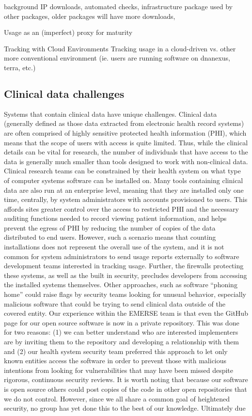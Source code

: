 \documentclass{article}
\begin{document}
background IP downloads, automated checks, infrastructure package used by other packages, older packages will have more downloads, 



Usage as an (imperfect) proxy for maturity

Tracking with Cloud Environments
Tracking usage in a cloud-driven vs. other more conventional environment (ie. users are running software on dnanexus, terra, etc.)



\subsection{Clinical data challenges}

Systems that contain clinical data have unique challenges.  Clinical data (generally defined as those data extracted from electronic health record systems) are often comprised of highly sensitive protected health information (PHI), which means that the scope of users with access is quite limited. Thus, while the clinical details can be vital for research, the number of individuals that have access to the data is generally much smaller than tools designed to work with non-clinical data. Clinical research teams can be constrained by their health system on what type of computer systems software can be installed on. Many tools containing clinical data are also run at an enterprise level, meaning that they are installed only one time, centrally, by system administrators with accounts provisioned to users. This affords sites greater control over the access to restricted PHI and the necessary auditing functions needed to record viewing patient information, and helps prevent the egress of PHI by reducing the number of copies of the data distributed to end users.  However, such a scenario means that counting installations does not represent the overall use of the system, and it is not common for system administrators to send usage reports externally to software development teams interested in tracking usage.  Further, the firewalls protecting these systems, as well as the built in security, precludes developers from accessing the installed systems themselves. Other approaches, such as software “phoning home” could raise flags by security teams looking for unusual behavior, especially malicious software that could be trying to send clinical data outside of the covered entity. Our experience within the EMERSE team is that even the GitHub page for our open source software is now in a private repository. This was done for two reasons: (1) we can better understand who are interested implementers are by inviting them to the repository and developing a relationship with them and (2) our health system security team preferred this approach to let only known entities access the software in order to prevent those with malicious intentions from looking for vulnerabilities that may have been missed despite rigorous, continuous security reviews.  It is worth noting that because our software is open source others could post copies of the code in other open repositories that we do not control.  However, since we all share a common goal of heightened security, no group has yet done this to the best of our knowledge. Ultimately due 
\end{document}
